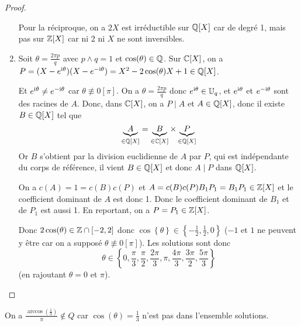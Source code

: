 \begin{proof}
\begin{enumerate}
		Pour la réciproque, on a $2X$ est irréductible sur $\mathbb{Q}[X]$ car de degré 1, mais pas sur $\mathbb{Z}[X]$ car ni 2 ni $X$ ne sont inversibles.

		\item Soit $\theta=\frac{2\pi p}{q}$ avec $p\wedge q=1$ et $\cos(\theta)\in\mathbb{Q}$. Sur $\mathbb{C}[X]$, on a $P=(X-e^{\mathrm{i}\theta})(X-e^{-\mathrm{i}\theta})=X^{2}-2\cos(\theta)X+1\in\mathbb{Q}[X]$.
		
		Et $e^{\mathrm{i}\theta}\neq e^{-\mathrm{i}\theta}$ car $\theta\not\equiv0[\pi]$. On a $\theta=\frac{2\pi p}{q}$ donc $e^{\mathrm{i}\theta}\in \mathbb{U}_{q}$, et $e^{\mathrm{i}\theta}$ et $e^{-\mathrm{i}\theta}$ sont des racines de $A$. Donc, dans $\mathbb{C}[X]$, on a $P\mid A$ et $A\in\mathbb{Q}[X]$, donc il existe $B\in\mathbb{Q}[X]$ tel que 
		\begin{equation}
			\underbrace{A}_{\in\mathbb{Q}[X]}=\underbrace{B}_{\in\mathbb{C}[X]}\times\underbrace{P}_{\in\mathbb{Q}[X]}
		\end{equation}
		Or $B$ s'obtient par la division euclidienne de $A$ par $P$, qui est indépendante du corps de référence, il vient $B\in\mathbb{Q}[X]$ et donc $A\mid P$ dans $\mathbb{Q}[X]$.

		On a $c(A)=1=c(B)c(P)$ et $A=c(B)c(P)B_{1}P_{1}=B_{1}P_{1}\in\mathbb{Z}[X]$ et le coefficient dominant de $A$ est donc 1. Donc le coefficient dominant de $B_{1}$ et de $P_{1}$ est aussi 1. En reportant, on a $P=P_{1}\in\mathbb{Z}[X]$.

		Donc $2\cos(\theta)\in\mathbb{Z}\cap[-2,2]$ donc $\cos\left\{\theta\right\}\in\left\{-\frac{1}{2},\frac{1}{2},0\right\}$ ($-1$ et $1$ ne peuvent y être car on a supposé $\theta\not\equiv0[\pi]$). Les solutions sont donc 
		\begin{equation}
			\boxed{
			\theta\in\left\{0,\frac{\pi}{3},\frac{\pi}{2},\frac{2\pi}{3},\pi,\frac{4\pi}{3},\frac{3\pi}{2},\frac{5\pi}{3}\right\}}
		\end{equation}
		(en rajoutant $\theta=0$ et $\pi$).
	\end{enumerate}
\end{proof}

\begin{remark}
	On a $\frac{\arccos(\frac{1}{3})}{\pi}\notin Q$ car $\cos(\theta)=\frac{1}{3}$ n'est pas dans l'ensemble solutions.
\end{remark}

